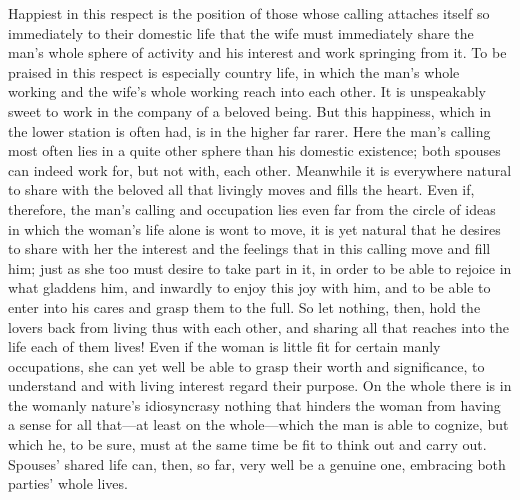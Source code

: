 \documentclass[12pt,a4paper]{book}
\begin{document}
Happiest in this respect is the position of those whose calling attaches
itself so immediately to their domestic life that the wife must immediately
share the man's whole sphere of activity and his interest and work
springing from it. To be praised in this respect is especially country
life, in which the man's whole working and the wife's whole working reach
into each other. It is unspeakably sweet to work in the company of a
beloved being. But this happiness, which in the lower station is often had,
is in the higher far rarer. Here the man's calling most often lies in a
quite other sphere than his domestic existence; both spouses can indeed
work for, but not with, each other. Meanwhile it is everywhere natural to
share with the beloved all that livingly moves and fills the heart. Even
if, therefore, the man's calling and occupation lies even far from the
circle of ideas in which the woman's life alone is wont to move, it is yet
natural that he desires to share with her the interest and the feelings
that in this calling move and fill him; just as she too must desire to take
part in it, in order to be able to rejoice in what gladdens him, and
inwardly to enjoy this joy with him, and to be able to enter into his cares
and grasp them to the full. So let nothing, then, hold the lovers back from
living thus with each other, and sharing all that reaches into the life
each of them lives! Even if the woman is little fit for certain manly
occupations, she can yet well be able to grasp their worth and
significance, to understand and with living interest regard their purpose.
On the whole there is in the womanly nature's idiosyncrasy nothing that
hinders the woman from having a sense for all that---at least on the
whole---which the man is able to cognize, but which he, to be sure, must at
the same time be fit to think out and carry out. Spouses' shared life can,
then, so far, very well be a genuine one, embracing both parties' whole
lives.
\end{document}
